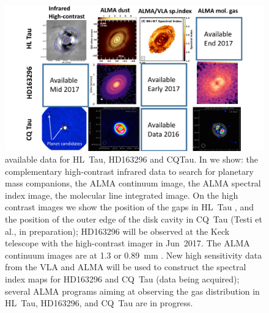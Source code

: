 \documentclass[10pt,fleqn,twoside]{article}
\begin{document}
\begin{figure}
\centerline{\includegraphics[scale=0.4,angle=0]{f_highres_data.pdf}}
\caption{ 
available data for HL~Tau, HD163296 and CQTau. In  we show: the complementary high-contrast infrared data to search for planetary mass companions, the ALMA continuum image, the ALMA spectral index image, the molecular line integrated image. On the high contrast images we show the position of the gaps in HL~Tau \citep{2015ApJ...812L..38T}, and the position of the outer edge of the 
disk cavity in CQ~Tau (Testi et al., in preparation); HD163296 will be observed at the Keck telescope with the high-contrast imager in Jun~2017. The ALMA continuum images are at 1.3 or 0.89~mm 
\citep[][Perez et al. in preparation]{2015ApJ...808L...3A,Isella2016}. New high sensitivity data from the VLA and ALMA will be used to construct the spectral index maps for HD163296 and CQ~Tau (data being acquired); several ALMA programs aiming at observing the gas distribution in HL~Tau, HD163296, and CQ~Tau are in progress.}
\label{f_nir_alma}
\end{figure}
\end{document}
